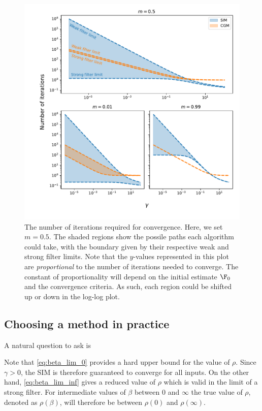 \begin{figure}[t]
    \includegraphics[width=0.95\linewidth]{Figures/conv_SIM_CGM_compared.pdf}    
    \caption{\small{The number of iterations required for convergence. Here, we set $m=0.5$. The shaded regions show the possile paths each algorithm could take, with the boundary given by their respective weak and strong filter limits. Note that the $y$-values represented in this plot are \textit{proportional} to the number of iterations needed to converge. The constant of proportionality will depend on the initial estimate $\F_0$ and the convergence criteria. As such, each region could be shifted up or down in the log-log plot. }}
    \label{fig:conv_SIM_CGM}
\end{figure}





\subsection{Choosing a method in practice}

A natural question to ask is 

Note that \cref{eq:beta_lim_0} provides a hard upper bound for the value of $\rho$. Since $\gamma > 0$, the SIM is therefore guaranteed to converge for all inputs. On the other hand, \cref{eq:beta_lim_inf} gives a reduced value of $\rho$ which is valid in the limit of a strong filter. For intermediate values of $\beta$ between 0 and $\infty$ the true value of $\rho$, denoted as $\rho(\beta)$, will therefore be between $\rho(0)$ and $\rho(\infty)$.

